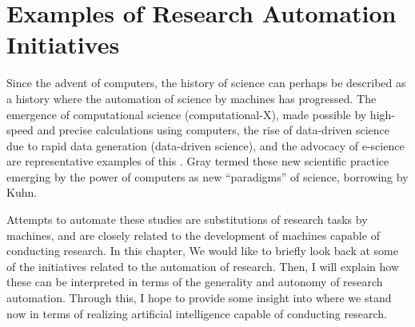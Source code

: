 \chapter{Examples of Research Automation Initiatives}
\label{chapter-literature-review}
Since the advent of computers, the history of science can perhaps be described as a history where the automation of science by machines has progressed. The emergence of computational science (computational-X), made possible by high-speed and precise calculations using computers, the rise of data-driven science due to rapid data generation (data-driven science), and the advocacy of e-science are representative examples of this \cite{hey2009fourth}. Gray termed these new scientific practice emerging by the power of computers as new ``paradigms'' of science, borrowing by Kuhn.

Attempts to automate these studies are substitutions of research tasks by machines, and are closely related to the development of machines capable of conducting research. In this chapter, We would like to briefly look back at some of the initiatives related to the automation of research. Then, I will explain how these can be interpreted in terms of the generality and autonomy of research automation. Through this, I hope to provide some insight into where we stand now in terms of realizing artificial intelligence capable of conducting research.


